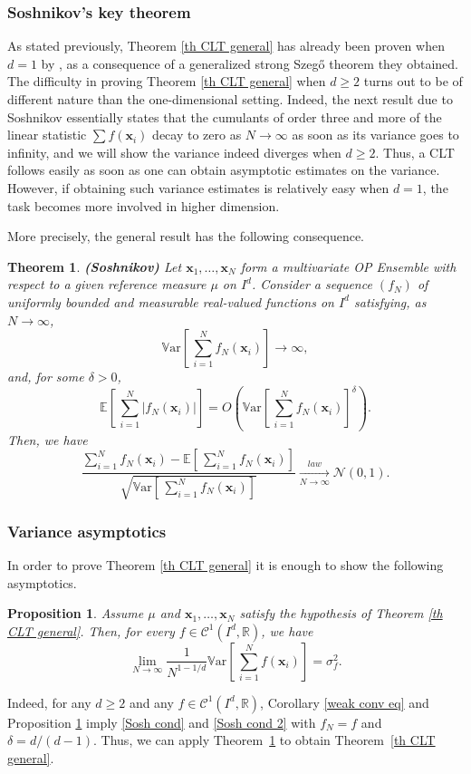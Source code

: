 \documentclass[a4paper,11pt]{article}
\numberwithin{equation}{section}
\newtheorem{theorem}{Theorem}[]
\newtheorem{proposition}[]{Proposition}
\theoremstyle{definition}
\newcommand{\rev}[1]{#1}
\newcommand{\eq}{\begin{equation}}
\newcommand{\qe}{\end{equation}}
\newcommand{\R}{\mathbb{R}}
\newcommand{\E}{\mathbb{E}}
\newcommand{\bv}{\mathbf}
\newcommand{\Var}{\mathbb{V}{\mathrm{ar}}}
\newcommand{\red}{\color{red}}
\renewcommand{\geq}{\geqslant}
\begin{document}
\subsubsection{Soshnikov's key theorem}
As stated previously,  Theorem \ref{th CLT general} has already been proven when
$d=1$ by \cite{BrDu13}, as a consequence of a generalized strong Szeg\H{o}
theorem they obtained. The difficulty in proving Theorem \ref{th CLT general}
when $d\geq 2$ turns out to be of different nature than the one-dimensional
setting. Indeed,  the next result due to Soshnikov essentially states that the
cumulants of order three and more of the linear statistic $\sum f(\bv x_i)$
decay to zero as $N\to\infty$ as soon as its variance goes to infinity, \rev{and we will show the variance indeed diverges when $d\geq 2$}. Thus, a CLT follows easily as soon as one can obtain asymptotic estimates on the variance. However, if obtaining such variance estimates is relatively easy when $d=1$, the task becomes more involved in higher dimension.

More precisely, the general result \cite[Theorem 1]{Sos02} has the following consequence.

\begin{theorem}{\bf (Soshnikov)}
\label{Sosh} Let $\bv x_1,\ldots,\bv x_N$ form a multivariate OP Ensemble with respect to a given reference measure $\mu$ on $I^d$. Consider a sequence $(f_N)$ of uniformly bounded and measurable real-valued functions on $I^d$ satisfying, as $N\to\infty$,
\eq
\label{Sosh cond}
\Var\left[\, \sum_{i=1}^Nf_N(\bv x_i)\right]\longrightarrow\infty,
\qe
and,  for some $\delta>0$,
\eq
\label{Sosh cond 2}
\E\left[\, \sum_{i=1}^N\big|f_N(\bv x_i)\big|\right]=O\left(\Var\left[\, \sum_{i=1}^Nf_N(\bv x_i)\right]^\delta\right).
\qe
Then, we have
$$
\frac{\displaystyle\sum_{i=1}^Nf_N(\bv x_i)-\E\left[\, \sum_{i=1}^Nf_N(\bv x_i)\right]}{\displaystyle\sqrt{\Var\left[\, \sum_{i=1}^Nf_N(\bv x_i)\right]}}
\xrightarrow[N\to\infty]{law}\mathcal N(0,1).
$$
\end{theorem}

\subsubsection{Variance asymptotics}
In order to prove Theorem \ref{th CLT general} it is enough to show the following asymptotics.

\begin{proposition}
\label{variance general CLT easy}
Assume $\mu$ and $\bv x_1,\ldots,\bv x_{N}$ satisfy the hypothesis of  Theorem \ref{th CLT general}.  Then, for every $f\in\mathscr C^1(I^d,\R)$, we have
\eq
\label{variance asympt}
\lim_{N\to\infty}\frac{1}{N^{1-1/d}}\Var\left[\, \sum_{i=1}^{N}f(\bv x_i)\right]=\sigma_f^2.
\qe
\end{proposition}
Indeed, for any $d\geq 2$ and any $f\in \mathscr C^1(I^d,\R)$, Corollary
\ref{weak conv eq} and Proposition \ref{variance general CLT easy} imply
\eqref{Sosh cond} and \eqref{Sosh cond 2} with $f_N=f$ and $\delta=d/(d-1)$.
Thus, we can apply Theorem~\ref{Sosh} to obtain Theorem~\ref{th CLT general}.
\end{document}
